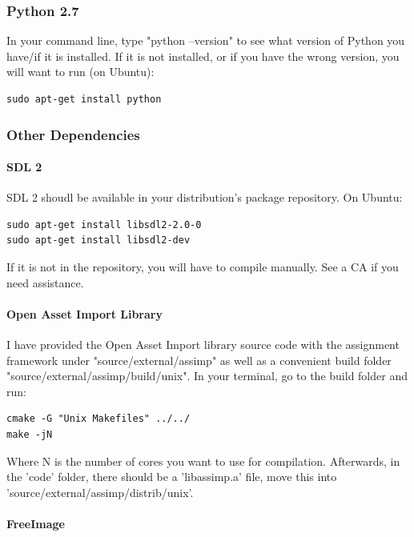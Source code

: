 \documentclass{article}
\begin{document}
\subsubsection*{Python 2.7}

In your command line, type "python --version" to see what version of Python you have/if it is installed. If it is not installed, or if you have the wrong version, you will want to run (on Ubuntu): 

\begin{lstlisting}
sudo apt-get install python
\end{lstlisting}

\subsubsection*{Other Dependencies}

\paragraph{\textbf{SDL 2}}

SDL 2 shoudl be available in your distribution's package repository. On Ubuntu:

\begin{lstlisting}
sudo apt-get install libsdl2-2.0-0
sudo apt-get install libsdl2-dev
\end{lstlisting}

If it is not in the repository, you will have to compile manually. See a CA if you need assistance.

\paragraph{\textbf{Open Asset Import Library}}

I have provided the Open Asset Import library source code with the assignment framework under "source/external/assimp" as well as a convenient build folder "source/external/assimp/build/unix". In your terminal, go to the build folder and run:

\begin{lstlisting}
cmake -G "Unix Makefiles" ../../
make -jN
\end{lstlisting}

Where N is the number of cores you want to use for compilation. Afterwards, in the 'code' folder, there should be a 'libassimp.a' file, move this into 'source/external/assimp/distrib/unix'.

\paragraph{\textbf{FreeImage}}
\end{document}
